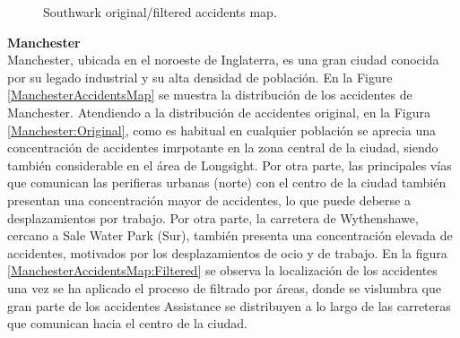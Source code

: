 \documentclass{uathesis-es}
\begin{document}
\begin{figure}[H]
{         \label{SouthwarkAccidentsMap:Filtered}
     }
     \caption{Southwark original/filtered accidents map.}
     \label{SouthwarkAccidentsMap}
 \end{figure}


\textbf{Manchester}\\

Manchester, ubicada en el noroeste de Inglaterra, es una gran ciudad conocida por su legado industrial y su alta densidad de población. En la Figure \ref{ManchesterAccidentsMap} se muestra la distribución de los accidentes de Manchester. Atendiendo a la distribución de accidentes original, en la Figura \ref{Manchester:Original}, como es habitual en cualquier población se aprecia una concentración de accidentes imrpotante en la zona central de la ciudad, siendo también considerable en el área de Longsight. Por otra parte, las principales vías que comunican las perifieras urbanas (norte) con el centro de la ciudad también presentan una concentración mayor de accidentes, lo que puede deberse a desplazamientos por trabajo. Por otra parte, la carretera de Wythenshawe, cercano a Sale Water Park (Sur), también presenta una concentración elevada de accidentes, motivados por los desplazamientos de ocio y de trabajo. En la figura \ref{ManchesterAccidentsMap:Filtered} se observa la localización de los accidentes una vez se ha aplicado el proceso de filtrado por áreas, donde se vislumbra que gran parte de los accidentes Assistance se distribuyen a lo largo de las carreteras que comunican hacia el centro de la ciudad.
\end{document}
